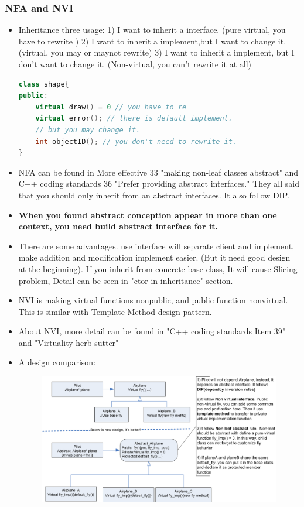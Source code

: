 \documentclass[a4paper,11pt,twoside]{book}
\begin{document}
\subsubsection{NFA and NVI}

\begin{itemize}

	\item Inheritance three usage: 1) I want to inherit a interface. (pure virtual, you have to rewrite ) 2) I want to inherit a implement,but I want to change it. (virtual, you may or maynot rewrite) 3) I want to inherit a implement, but I don't want to change it. (Non-virtual, you can't rewrite it at all)
\begin{lstlisting}[frame=single, language=c++]
class shape{
public:
	virtual draw() = 0 // you have to re
	virtual error(); // there is default implement.
	// but you may change it.
	int objectID(); // you don't need to rewrite it.
}
\end{lstlisting}

\item NFA can be found in More effective 33 "making non-leaf classes abstract" and C++ coding standards 36 "Prefer providing abstract interfaces." They all said that you should only inherit from an abstract interfaces. It also follow DIP.

\item \textbf{When you found abstract conception appear in more than one context, you need build abstract interface for it. }

\item There are some advantages. use interface will separate client and implement, make addition and modification implement easier. (But it need good design at the beginning). If you inherit from concrete base class, It will cause Slicing problem, Detail can be seen in "ctor in inheritance" section.

\item NVI is making virtual functions nonpublic, and public function nonvirtual. This is similar with Template Method design pattern.  

\item About NVI, more detail can be found in "C++ coding standards Item 39" and "Virtuality herb sutter"

\item A design comparison:
\begin{figure}
	\centering
	\includegraphics[width=0.8\linewidth]{pics/NVI.png}
	\caption{}
	\label{fig:nvi}
\end{figure}

\end{itemize}
\end{document}
